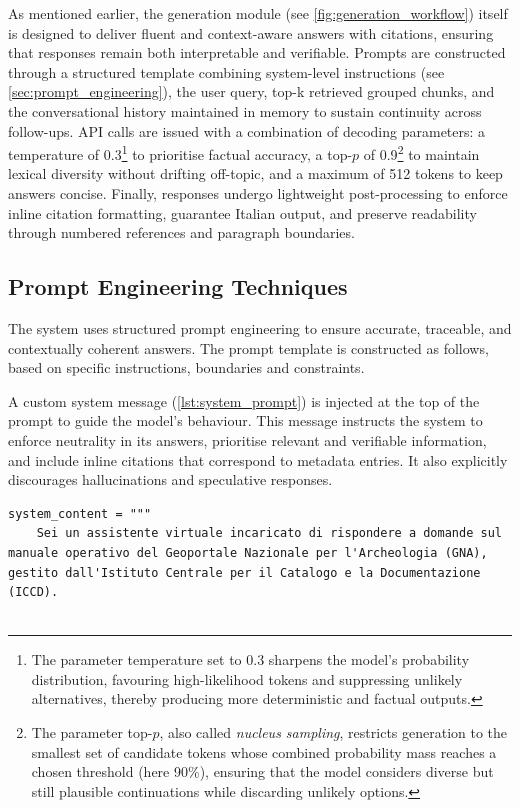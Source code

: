 \begin{spacing}{1.5}
As mentioned earlier, the generation module (see \autoref{fig:generation_workflow}) itself is designed to deliver fluent and context-aware answers with citations, ensuring that responses remain both interpretable and verifiable. Prompts are constructed through a structured template combining system-level instructions (see \autoref{sec:prompt_engineering}), the user query, top-k retrieved grouped chunks, and the conversational history maintained in memory to sustain continuity across follow-ups. API calls are issued with a combination of decoding parameters: a temperature of 0.3\footnote{The parameter temperature set to 0.3 sharpens the model’s probability distribution, favouring high-likelihood tokens and suppressing unlikely alternatives, thereby producing more deterministic and factual outputs.} to prioritise factual accuracy, a top-$p$ of 0.9\footnote{The parameter top-$p$, also called \textit{nucleus sampling}, restricts generation to the smallest set of candidate tokens whose combined probability mass reaches a chosen threshold (here 90\%), ensuring that the model considers diverse but still plausible continuations while discarding unlikely options.} to maintain lexical diversity without drifting off-topic, and a maximum of 512 tokens to keep answers concise. Finally, responses undergo lightweight post-processing to enforce inline citation formatting, guarantee Italian output, and preserve readability through numbered references and paragraph boundaries.



\subsection{Prompt Engineering Techniques} \label{sec:prompt_engineering}
The system uses structured prompt engineering to ensure accurate, traceable, and contextually coherent answers. The prompt template is constructed as follows, based on specific instructions, boundaries and constraints.

A custom system message (\autoref{lst:system_prompt}) is injected at the top of the prompt to guide the model’s behaviour. This message instructs the system to enforce neutrality in its answers, prioritise relevant and verifiable information, and include inline citations that correspond to metadata entries. It also explicitly discourages hallucinations and speculative responses.

\vspace{0.6em}
\begin{lstlisting}[breaklines=true,
                  frame=none,
                   caption={System prompt specifying assistant constraints and response instructions.},
                   captionpos=b,
                   label={lst:system_prompt},
  xleftmargin=0.05\textwidth,
  xrightmargin=0.05\textwidth,
  basicstyle=\fontsize{9}{10.5}\selectfont\ttfamily]
system_content = """
    Sei un assistente virtuale incaricato di rispondere a domande sul manuale operativo del Geoportale Nazionale per l'Archeologia (GNA), gestito dall'Istituto Centrale per il Catalogo e la Documentazione (ICCD).


\end{lstlisting}
\end{spacing}
